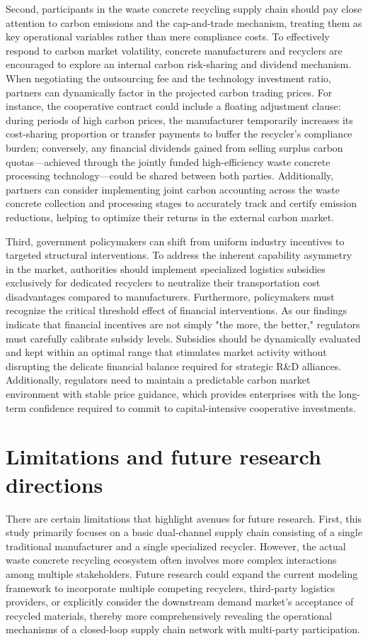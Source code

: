 \documentclass[authoryear,preprint,review,times,10pt]{elsarticle}
\begin{document}
Second, participants in the waste concrete recycling supply chain should pay close attention to carbon emissions and the cap-and-trade mechanism, treating them as key operational variables rather than mere compliance costs. To effectively respond to carbon market volatility, concrete manufacturers and recyclers are encouraged to explore an internal carbon risk-sharing and dividend mechanism. When negotiating the outsourcing fee and the technology investment ratio, partners can dynamically factor in the projected carbon trading prices. For instance, the cooperative contract could include a floating adjustment clause: during periods of high carbon prices, the manufacturer temporarily increases its cost-sharing proportion or transfer payments to buffer the recycler's compliance burden; conversely, any financial dividends gained from selling surplus carbon quotas—achieved through the jointly funded high-efficiency waste concrete processing technology—could be shared between both parties. Additionally, partners can consider implementing joint carbon accounting across the waste concrete collection and processing stages to accurately track and certify emission reductions, helping to optimize their returns in the external carbon market.

Third, government policymakers can shift from uniform industry incentives to targeted structural interventions. To address the inherent capability asymmetry in the market, authorities should implement specialized logistics subsidies exclusively for dedicated recyclers to neutralize their transportation cost disadvantages compared to manufacturers. Furthermore, policymakers must recognize the critical threshold effect of financial interventions. As our findings indicate that financial incentives are not simply "the more, the better," regulators must carefully calibrate subsidy levels. Subsidies should be dynamically evaluated and kept within an optimal range that stimulates market activity without disrupting the delicate financial balance required for strategic R\&D alliances. Additionally, regulators need to maintain a predictable carbon market environment with stable price guidance, which provides enterprises with the long-term confidence required to commit to capital-intensive cooperative investments.

\section{Limitations and future research directions}
There are certain limitations that highlight avenues for future research. First, this study primarily focuses on a basic dual-channel supply chain consisting of a single traditional manufacturer and a single specialized recycler. However, the actual waste concrete recycling ecosystem often involves more complex interactions among multiple stakeholders. Future research could expand the current modeling framework to incorporate multiple competing recyclers, third-party logistics providers, or explicitly consider the downstream demand market's acceptance of recycled materials, thereby more comprehensively revealing the operational mechanisms of a closed-loop supply chain network with multi-party participation.
\end{document}
